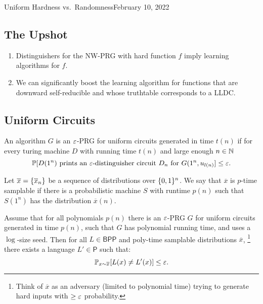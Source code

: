 \begin{lecture}{4}{Uniform Hardness vs.\ Randomness}{February 10, 2022}

\subsection*{The Upshot}

\begin{enumerate}
  \item Distinguishers for the NW-PRG with hard function $f$ imply learning
    algorithms for $f$.
  \item We can significantly boost the learning algorithm for functions that
    are downward self-reducible and whose truthtable corresponds to a LLDC.
\end{enumerate}


\subsection{Uniform Circuits}

\begin{definition}
	An algorithm $G$ is an $\varepsilon$-PRG for uniform circuits generated in time
	$t(n)$ if for every turing machine $D$ with running time $t(n)$ and
	large enough $n \in \mathbb{N}$
	\[
		\mathbb{P}[D(1^n) \text{ prints an } \varepsilon\text{-distinguisher circuit }
		D_n \text{ for } G(1^n, u_{l(n)}] \leq \varepsilon.
	\]
\end{definition}

\begin{definition}
	Let $\overline{x} = \{\overline{x}_n\}$ be a sequence of distributions
	over $\{0, 1\}^n$. We say that $\overline{x}$ is $p$-time samplable
	if there is a probabilistic machine $S$ with runtime $p(n)$ such that
	$S(1^n)$ has the distribution $\overline{x}(n)$.
\end{definition}

\begin{theorem}
	Assume that for all polynomials $p(n)$ there is an $\varepsilon$-PRG $G$ for
	uniform circuits generated in time $p(n)$, such that $G$ has polynomial
	running time, and uses a $\log$-size seed. Then for all
	$L \in \textsf{BPP}$ and poly-time samplable distributions $\overline{x}$,%
	\footnote{Think of $\overline{x}$ as an adversary (limited to polynomial
	time) trying to generate hard inputs with $\geq \varepsilon$ probability.}
	there exists a language $L' \in \textsf{P}$ such that:
	\[
		\mathbb{P}_{x \sim \overline{x}}[L(x) \neq L'(x)] \leq \varepsilon.
	\]
\end{theorem}


\end{lecture}
